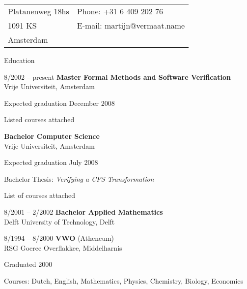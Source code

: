 \documentclass[a4paper,11pt]{article}
\newenvironment{sublist}{%
  \begin{list}{}{%
      \setlength{\itemsep}{0em}\setlength{\parsep}{0em}%
      \setlength{\topsep}{0em}\setlength{\parskip}{0em}%
    }%
}%
{ \end{list} }
\begin{document}
\newlength{\oldcvlabelwidth}
\renewcommand*{\cvbibname}{}

\begin{cv}{} %



\hspace{7em}\begin{tabular}{p{12em}l}
  Platanenweg 18hs  & Phone: +31 6 409 202 76\\
  1091 KS           & E-mail: martijn@vermaat.name\\
  Amsterdam         &
\end{tabular}

\vspace{1em}


\begin{cvlist}{Education}
\item[8/2002 -- present]
  {\bf Master Formal Methods and Software Verification}\\
  Vrije Universiteit, Amsterdam
  \begin{sublist}
  \item Expected graduation December 2008
  \item Listed courses attached
  \end{sublist}
  {\bf Bachelor Computer Science}\\
  Vrije Universiteit, Amsterdam
  \begin{sublist}
  \item Expected graduation July 2008
  \item Bachelor Thesis: \textit{Verifying a CPS Transformation}
  \item List of courses attached
  \end{sublist}
\item[8/2001 -- 2/2002]
  {\bf Bachelor Applied Mathematics}\\
  Delft University of Technology, Delft
\item[8/1994 -- 8/2000]
  {\bf VWO} (Atheneum)\\
  RSG Goeree Overflakkee,  Middelharnis
  \begin{sublist}
    \item Graduated 2000
    \item Courses: Dutch, English, Mathematics, Physics, Chemistry, Biology, Economics
  \end{sublist}
\end{cvlist}



\end{cv}
\end{document}

